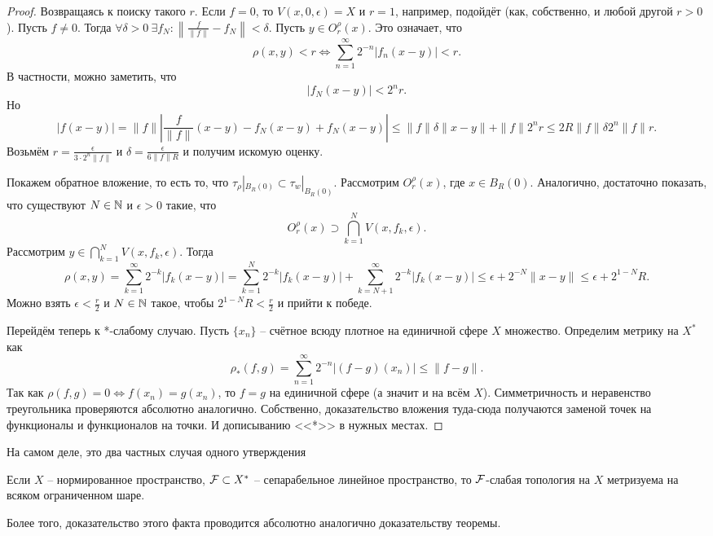 \begin{proof}
    Возвращаясь к поиску такого $r$.
    Если $f = 0$, то $V(x, 0, \epsilon) = X$ и $r = 1$, например, подойдёт (как, собственно, и любой другой $r > 0$).
    Пусть $f \neq 0$.
    Тогда $\forall \delta > 0 \ \exists f_N\colon \left\|\frac{f}{\|f\|} - f_N\right\| < \delta$.
    Пусть $y \in O_r^{\rho}(x)$.
    Это означает, что
    \[
        \rho(x, y) < r \Longleftrightarrow \sum_{n = 1}^{\infty} 2^{-n}|f_n(x - y)| < r.
    \]
    В частности, можно заметить, что
    \[
        |f_N(x - y)| < 2^n r.
    \]
    Но
    \[
        |f(x - y)| = \|f\|\left|\frac{f}{\|f\|}(x - y) - f_N(x - y) + f_N(x - y)\right| \leq \|f\| \delta \|x - y\| + \|f\|2^n r \leq 2R\|f\|\delta 2^n\|f\|r.
    \]
    Возьмём $r = \frac{\epsilon}{3\cdot 2^n\|f\|}$ и $\delta = \frac{\epsilon}{6\|f\|R}$ и получим искомую оценку.

    Покажем обратное вложение, то есть то, что $\tau_\rho|_{B_R(0)} \subset \tau_w|_{B_R(0)}$.
    Рассмотрим $O_r^{\rho}(x)$, где $x \in B_R(0)$.
    Аналогично, достаточно показать, что существуют $N \in \mathbb{N}$ и $\epsilon > 0$ такие, что
    \[
        O_r^{\rho}(x) \supset \bigcap_{k = 1}^{N} V(x, f_k, \epsilon).
    \]
    Рассмотрим $y \in \bigcap_{k = 1}^{N} V(x, f_k, \epsilon)$.
    Тогда
    \[
        \rho(x, y) = \sum_{k = 1}^{\infty} 2^{-k}|f_k(x - y)| = \sum_{k = 1}^{N}2^{-k}|f_k(x - y)| + \sum_{k = N + 1}^{\infty} 2^{-k}|f_k(x - y)| \leq \epsilon + 2^{-N}\|x - y\| \leq \epsilon + 2^{1-N}R.
    \]
    Можно взять $\epsilon < \frac{r}{2}$ и $N \in \mathbb{N}$ такое, чтобы $2^{1-N}R < \frac{r}{2}$ и прийти к победе.


    Перейдём теперь к *-слабому случаю.
    Пусть $\{x_n\}$ -- счётное всюду плотное на единичной сфере $X$ множество.
    Определим метрику на $X^*$ как
    \[
        \rho_*(f, g) = \sum_{n = 1}^{\infty} 2^{-n}|(f - g)(x_n)| \leq \|f - g\|.
    \]
    Так как $\rho(f, g) = 0 \Longleftrightarrow f(x_n) = g(x_n)$, то $f = g$ на единичной сфере (а значит и на всём $X$).
    Симметричность и неравенство треугольника проверяются абсолютно аналогично.
    Собственно, доказательство вложения туда-сюда получаются заменой точек на функционалы и функционалов на точки.
    И дописыванию <<*>> в нужных местах.
\end{proof}
\begin{notet}
    На самом деле, это два частных случая одного утверждения
    \begin{proposition}
        Если $X$ -- нормированное пространство, $\mathcal{F} \subset X^*$ -- сепарабельное линейное пространство, то $\mathcal{F}$-слабая топология на $X$ метризуема на всяком ограниченном шаре.
    \end{proposition}
    Более того, доказательство этого факта проводится абсолютно аналогично доказательству теоремы.
\end{notet}
